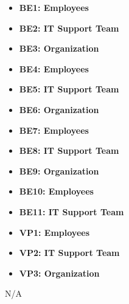\documentclass[]{article}
\begin{document}
 \begin{itemize}
    \item {\bf BE1: Employees}
    \item {\bf BE2: IT Support Team}
    \item {\bf BE3: Organization}
    \item {\bf BE4: Employees}
    \item {\bf BE5: IT Support Team}
    \item {\bf BE6: Organization}
    \item {\bf BE7: Employees}
    \item {\bf BE8: IT Support Team}
    \item {\bf BE9: Organization}
    \item {\bf BE10: Employees}
    \item {\bf BE11: IT Support Team}
\end{itemize}

 \begin{itemize}
    \item {\bf VP1: Employees}
    \item {\bf VP2: IT Support Team}
    \item {\bf VP3: Organization}
\end{itemize}

 N/A

	
\end{document}
